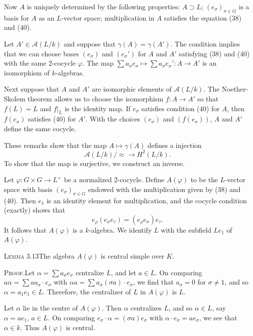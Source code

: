 Now $A$ is uniquely determined by the following properties: $A\supset L$; $(e_\sigma)_{\sigma\in G}$ is a basis for $A$ as an $L$-vector space; multiplication in $A$ satisfies the equation (38) and (40).

Let $A'\in\mathcal{A}(L/k)$ and suppose that $\gamma(A)=\gamma(A')$. The condition implies that we can choose bases $(e_\sigma)$ and $(e_\sigma')$ for $A$ and $A'$ satisfying (38) and (40) with the same 2-cocycle $\varphi$. The map $\sum a_\sigma e_\sigma\mapsto\sum a_\sigma e_\sigma'\colon A\to A'$ is an isomorphism of $k$-algebras.

Next suppose that $A$ and $A'$ are isomorphic elements of $\mathcal{A}(L/k)$. The Noether-Skolem theorem allows us to choose the isomorphism $f\colon A\to A'$ so that $f(L)=L$ and $f|_L$ is the identity map. If $e_\sigma$ satisfies condition (40) for $A$, then $f(e_\sigma)$ satisfies (40) for $A'$. With the choices $(e_\sigma)$ and $(f(e_\sigma))$, $A$ and $A'$ define the same cocycle.

These remarks show that the map $A\mapsto\gamma(A)$ defines a injection
\[
\mathcal{A}(L/k)/\approx\to H^2(L/k).
\]
To show that the map is surjective, we construct an inverse.

Let $\varphi\colon G\times G\to L^\times$ be a normalized 2-cocycle. Define $A(\varphi)$ to be the $L$-vector space with basis $(e_\sigma)_{\sigma\in G}$ endowed with the multiplication given by (38) and (40). Then $e_1$ is an identity element for multiplication, and the cocycle condition (exactly) shows that
\[
e_\rho(e_\sigma e_\tau)=(e_\rho e_\sigma)e_\tau.
\]
It follows that $A(\varphi)$ is a $k$-algebra. We identify $L$ with the subfield $Le_1$ of $A(\varphi)$.

\noindent\textsc{Lemma 3.13}\quad The algebra $A(\varphi)$ is central simple over $K$.

\noindent\textsc{Proof.}\quad Let $\alpha=\sum a_\sigma e_\sigma$ centralize $L$, and let $a\in L$. On comparing $a\alpha=\sum aa_\sigma\cdot e_\sigma$ with $\alpha a=\sum a_\sigma(\sigma a)\cdot e_\sigma$, we find that $a_\sigma=0$ for $\sigma\neq1$, and so $\alpha=a_1e_1\in L$. Therefore, the centralizer of $L$ in $A(\varphi)$ is $L$.

Let $\alpha$ lie in the centre of $A(\varphi)$. Then $\alpha$ centralizes $L$, and so $\alpha\in L$, say $\alpha=ae_1$, $a\in L$. On comparing $e_\sigma\cdot\alpha=(\sigma a)e_\sigma$ with $\alpha\cdot e_\sigma=ae_\sigma$, we see that $\alpha\in k$. Thus $A(\varphi)$ is central.

